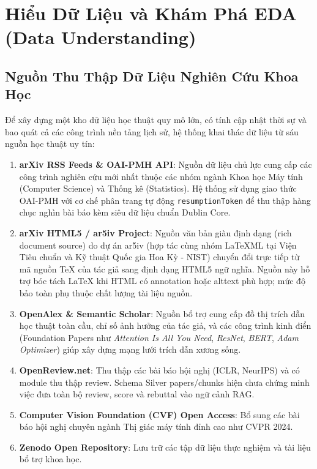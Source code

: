 
\chapter{Hiểu Dữ Liệu và Khám Phá EDA (Data Understanding)}
\label{chap:data_understanding}

\section{Nguồn Thu Thập Dữ Liệu Nghiên Cứu Khoa Học}

Để xây dựng một kho dữ liệu học thuật quy mô lớn, có tính cập nhật thời sự và bao quát cả các công trình nền tảng lịch sử, hệ thống khai thác dữ liệu từ sáu nguồn học thuật uy tín:

\begin{enumerate}[label=\textbf{\arabic*.}]
  \item \textbf{arXiv RSS Feeds \& OAI-PMH API}: Nguồn dữ liệu chủ lực cung cấp các công trình nghiên cứu mới nhất thuộc các nhóm ngành Khoa học Máy tính (Computer Science) và Thống kê (Statistics). Hệ thống sử dụng giao thức OAI-PMH với cơ chế phân trang tự động \texttt{resumptionToken} để thu thập hàng chục nghìn bài báo kèm siêu dữ liệu chuẩn Dublin Core.
  \item \textbf{arXiv HTML5 / ar5iv Project}: Nguồn văn bản giàu định dạng (rich document source) do dự án ar5iv (hợp tác cùng nhóm LaTeXML tại Viện Tiêu chuẩn và Kỹ thuật Quốc gia Hoa Kỳ - NIST) chuyển đổi trực tiếp từ mã nguồn TeX của tác giả sang định dạng HTML5 ngữ nghĩa. Nguồn này hỗ trợ bóc tách LaTeX khi HTML có annotation hoặc alttext phù hợp; mức độ bảo toàn phụ thuộc chất lượng tài liệu nguồn.
  \item \textbf{OpenAlex \& Semantic Scholar}: Nguồn bổ trợ cung cấp đồ thị trích dẫn học thuật toàn cầu, chỉ số ảnh hưởng của tác giả, và các công trình kinh điển (Foundation Papers như \textit{Attention Is All You Need}, \textit{ResNet}, \textit{BERT}, \textit{Adam Optimizer}) giúp xây dựng mạng lưới trích dẫn xương sống.
  \item \textbf{OpenReview.net}: Thu thập các bài báo hội nghị (ICLR, NeurIPS) và có module thu thập review. Schema Silver papers/chunks hiện chưa chứng minh việc đưa toàn bộ review, score và rebuttal vào ngữ cảnh RAG.
  \item \textbf{Computer Vision Foundation (CVF) Open Access}: Bổ sung các bài báo hội nghị chuyên ngành Thị giác máy tính đỉnh cao như CVPR 2024.
  \item \textbf{Zenodo Open Repository}: Lưu trữ các tập dữ liệu thực nghiệm và tài liệu bổ trợ khoa học.
\end{enumerate}

